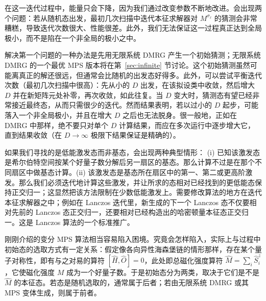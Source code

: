 \documentclass[a4paper,10pt,oneside,onecolumn,1p,times]{elsarticle}
\begin{document}
在这一迭代过程中，能量只会下降，因为我们通过改变参数不断地改进。会出现两个问题：若从随机态出发，最初几次扫描中迭代本征求解器对 $M^{\sigma_\ell}$ 的猜测会非常糟糕，导致迭代次数很大、性能很差。此外，我们无法保证这一过程真正达到全局极小，而不是陷在一个非全局的极小之中。

解决第一个问题的一种办法是先用无限系统 DMRG 产生一个初始猜测；无限系统 DMRG 的一个最优 MPS 版本将在第~\ref{sec:infinite} 节讨论。这个初始猜测虽然可能离真正的解还很远，但通常会比随机的出发态好得多。此外，可以尝试平衡迭代次数（最初几次扫描中很高）：先从小的 $D$ 出发，在该拟设类中收敛，然后增大 $D$ 并在新矩阵元处补零，再次收敛，如此往复。当 $D$ 变大时，猜测态有望已经非常接近最终态，从而只需很少的迭代。然而结果表明，若以过小的 $D$ 起步，可能落入一个非全局极小，并且在增大 $D$ 之后也无法脱身。很一般地，正如在 DMRG 中那样，绝不要只对单个 $D$ 计算结果，而应在多次运行中逐步增大它，直到结果收敛（在 $D\rightarrow\infty$ 极限下结果保证是精确的）。

如果我们寻找的是低能激发态而非基态，会出现两种典型情形：
(i) 已知该激发态是希尔伯特空间按某个好量子数分解后另一扇区的基态。那么计算不过是在那个不同扇区中做基态计算。(ii) 该激发态是基态所在扇区中的第一、第二或更高阶激发。那么我们必须迭代地计算这些激发，并让所求的态相对已经找到的更低能态保持正交归一；这显然把该方法限制在少数低能激发上。需要修改算法的地方在迭代本征求解器之中；例如在 Lanczos 迭代里，新生成的下一个 Lanczos 态不仅要相对先前的 Lanczos 态正交归一，还要相对已经构造出的哈密顿量本征态正交归一。这是 Lanczos 算法的一个标准推广。

刚刚介绍的变分 MPS 算法相当容易陷入困境。究竟会怎样陷入，实际上与过程中初始态的选取方式有一定关系：假定像各向异性海森堡链的情形那样，存在某个量子对称性，即有与之对易的算符 $[\hat{H},\hat{O}]=0$，此处即总磁化强度算符 $\hat{M}=\sum_i \hat{S}^z_i$，它使磁化强度 $M$ 成为一个好量子数。于是初始态分为两类，取决于它们是不是 $\hat{M}$ 的本征态。若态是随机选取的，通常属于后者；若由无限系统 DMRG 或其 MPS 变体生成，则属于前者。
\end{document}
